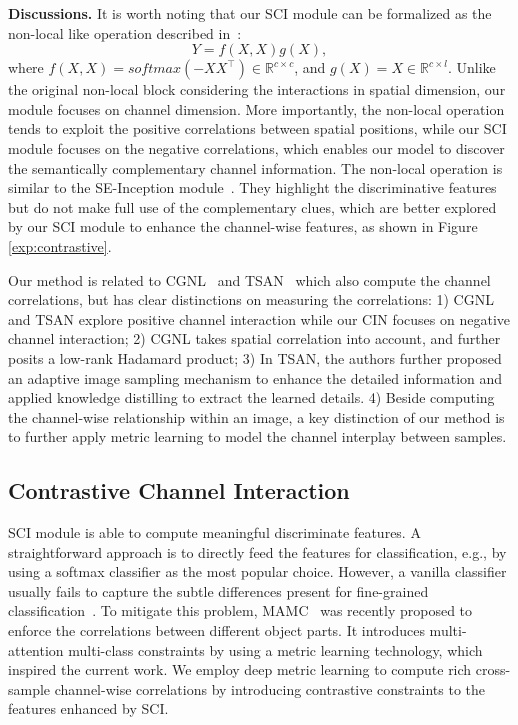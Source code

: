 \documentclass[letterpaper]{article} \usepackage{aaai20}  \usepackage{times}  \usepackage{helvet} \usepackage{courier}  \usepackage[hyphens]{url}  \usepackage{graphicx} \urlstyle{rm} \def\UrlFont{\rm}  \usepackage{graphicx}  \frenchspacing  \setlength{\pdfpagewidth}{8.5in}  \setlength{\pdfpageheight}{11in}  \usepackage{amsmath,amssymb}
\begin{document}
\textbf{Discussions.} It is worth noting that our SCI module can be formalized as the non-local like operation described in~\cite{DBLP:journals/corr/abs-1711-07971}:
\begin{equation}\label{eq:atten-no-local}
Y = f(X,X)g(X),
\end{equation}
where $f(X,X) = softmax(-XX^\top) \in \mathbb{R}^{c \times c}$, and $g(X) = X \in \mathbb{R}^{c \times l}$. Unlike the original non-local block considering the interactions in spatial dimension, our module focuses on channel dimension.
More importantly, the non-local operation tends to exploit the positive correlations between spatial positions, while our SCI module focuses on the negative correlations, which enables our model to discover the semantically complementary channel information.
The non-local operation is similar to the SE-Inception module~\cite{DBLP:journals/corr/abs-1709-01507}. They highlight the discriminative features but do not make full use of the complementary clues, which are better explored by our SCI module to enhance the channel-wise features, as shown in Figure \ref{exp:contrastive}.

Our method is related to CGNL~\cite{yue2018compact} and TSAN~\cite{DBLP:conf/cvpr/ZhengFZL19} which also compute the channel correlations, but has clear
distinctions on measuring the correlations:
1) CGNL and TSAN explore positive channel interaction while our CIN focuses on negative channel interaction;
2) CGNL takes spatial correlation into account, and further posits a low-rank Hadamard product;
3) In TSAN, the authors further proposed an adaptive image sampling mechanism to enhance the detailed information
and applied knowledge distilling to extract the learned details.
4) Beside computing the channel-wise relationship within an image, a key distinction of our method is to  further apply metric learning to model the channel interplay between samples.

\subsection{Contrastive Channel Interaction}
\label{sec:cca}
SCI module is able to compute meaningful discriminate features. A straightforward approach is to directly feed the features for classification, e.g., by using a softmax classifier as the most popular choice.
However, a vanilla classifier usually fails to capture the subtle differences present for fine-grained classification~\cite{DBLP:conf/cvpr/CuiZLB16}. To mitigate this problem, MAMC~\cite{DBLP:conf/eccv/SunYZD18} was recently proposed to enforce the correlations between different object parts. It introduces multi-attention multi-class constraints by using a metric learning technology, which inspired the current work.
We employ deep metric learning to compute rich cross-sample channel-wise correlations by introducing contrastive constraints to the features enhanced by SCI.
\end{document}
